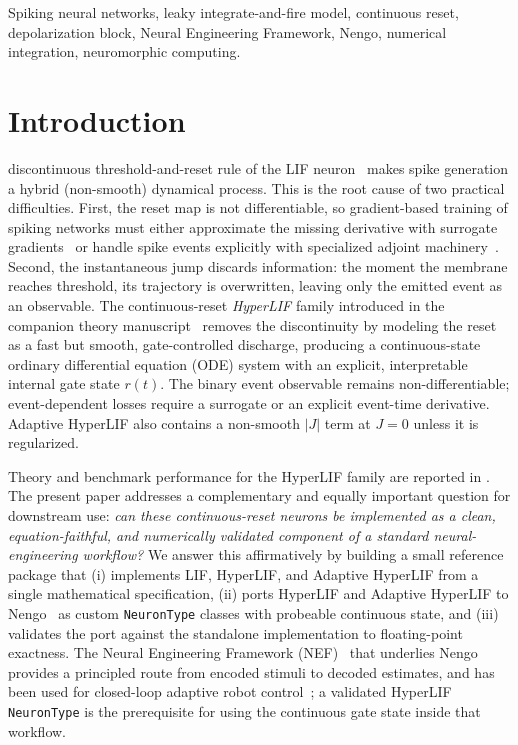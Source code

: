 \documentclass[journal]{IEEEtran}
\newcommand{\code}[1]{\texttt{#1}}
\begin{document}
\begin{IEEEkeywords}
Spiking neural networks, leaky integrate-and-fire model, continuous reset,
depolarization block, Neural Engineering Framework, Nengo, numerical
integration, neuromorphic computing.
\end{IEEEkeywords}

\section{Introduction}\label{sec:intro}
 discontinuous threshold-and-reset rule of the LIF
neuron~\cite{lapicque1907} makes spike generation a hybrid (non-smooth)
dynamical process. This is the root cause of two practical difficulties. First,
the reset map is not differentiable, so gradient-based training of spiking
networks must either approximate the missing derivative with surrogate
gradients~\cite{neftci2019surrogate} or handle spike events explicitly with
specialized adjoint machinery~\cite{wunderlich2021eventprop}. Second, the
instantaneous jump discards information: the moment the membrane reaches
threshold, its trajectory is overwritten, leaving only the emitted event as an
observable. The continuous-reset \emph{HyperLIF} family introduced in the
companion theory manuscript~\cite{hyperlif_theory} removes the discontinuity by
modeling the reset as a fast but smooth, gate-controlled discharge, producing a
continuous-state ordinary differential equation (ODE) system with an explicit,
interpretable internal gate state $r(t)$. The binary event observable remains
non-differentiable; event-dependent losses require a surrogate or an explicit
event-time derivative. Adaptive HyperLIF also contains a non-smooth $|J|$ term
at $J=0$ unless it is regularized.

Theory and benchmark performance for the HyperLIF family are reported in
\cite{hyperlif_theory}. The present paper addresses a complementary and equally
important question for downstream use: \emph{can these continuous-reset neurons
be implemented as a clean, equation-faithful, and numerically validated
component of a standard neural-engineering workflow?} We answer this
affirmatively by building a small reference package that (i) implements LIF,
HyperLIF, and Adaptive HyperLIF from a single mathematical specification, (ii)
ports HyperLIF and Adaptive HyperLIF to Nengo~\cite{bekolay2014nengo} as custom
\code{NeuronType} classes with probeable continuous state, and (iii) validates
the port against the standalone implementation to floating-point exactness. The
Neural Engineering Framework (NEF)~\cite{eliasmith2003neural} that underlies
Nengo provides a principled route from encoded stimuli to decoded estimates, and
has been used for closed-loop adaptive robot control~\cite{dewolf2016reach}; a
validated HyperLIF \code{NeuronType} is the prerequisite for using the
continuous gate state inside that workflow.
\end{document}
